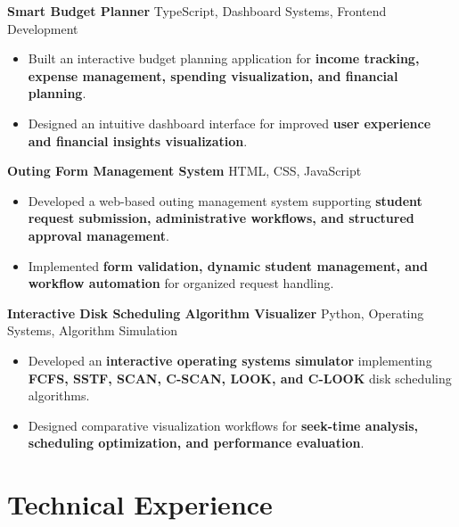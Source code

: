 \documentclass[a4paper,11pt]{article}
\newcommand{\resumeItem}[1]{
\item \small{#1 \vspace{-2pt}}
}
\newcommand{\resumeProject}[2]{
\vspace{2pt}
\textbf{#1} \hfill {\small #2}
\vspace{2pt}
}
\begin{document}
\resumeProject
{Smart Budget Planner}
{TypeScript, Dashboard Systems, Frontend Development}

\begin{itemize}[leftmargin=*]

\resumeItem{Built an interactive budget planning application for \textbf{income tracking, expense management, spending visualization, and financial planning}.}

\resumeItem{Designed an intuitive dashboard interface for improved \textbf{user experience and financial insights visualization}.}

\end{itemize}

\vspace{1mm}

\resumeProject
{Outing Form Management System}
{HTML, CSS, JavaScript}

\begin{itemize}[leftmargin=*]

\resumeItem{Developed a web-based outing management system supporting \textbf{student request submission, administrative workflows, and structured approval management}.}

\resumeItem{Implemented \textbf{form validation, dynamic student management, and workflow automation} for organized request handling.}

\end{itemize}

\vspace{1mm}

\resumeProject
{Interactive Disk Scheduling Algorithm Visualizer}
{Python, Operating Systems, Algorithm Simulation}

\begin{itemize}[leftmargin=*]

\resumeItem{Developed an \textbf{interactive operating systems simulator} implementing \textbf{FCFS, SSTF, SCAN, C-SCAN, LOOK, and C-LOOK} disk scheduling algorithms.}

\resumeItem{Designed comparative visualization workflows for \textbf{seek-time analysis, scheduling optimization, and performance evaluation}.}

\end{itemize}

\vspace{-8pt}





\section{Technical Experience}
\end{document}
